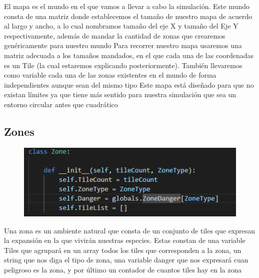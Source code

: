 \documentclass{llncs}
\begin{document}
El mapa es el mundo en el que vamos a llevar a cabo la simulación. Este mundo consta de una matriz donde establecemos el tamaño de nuestro mapa de acuerdo al largo y ancho, a lo cual nombramos tamaño del eje X y tamaño del Eje Y respectivamente, además de mandar la cantidad de zonas que crearemos genéricamente para nuestro mundo
\newline
\newline
Para recorrer nuestro mapa usaremos una matriz adecuada a los tamaños mandados, en el que cada una de las coordenadas es un Tile (la cual estaremos explicando posteriormente). También llevaremos como variable cada una de las zonas existentes en el mundo de forma independientes aunque sean del mismo tipo
\newline
\newline
Este mapa está diseñado para que no existan límites ya que tiene más sentido para nuestra simulación que sea un entorno circular antes que cuadrático

\subsection{Zones}
\begin{figure}
	\centering
	\includegraphics[width=0.7\linewidth]{imagenes/Zona}
	\label{fig:zona}
\end{figure}


Una zona es un ambiente natural que consta de un conjunto de tiles que expresan la expansión en la que vivirán nuestras especies.
\newline
\newline
Estas constan de una variable Tiles que agrupará en un array todos los tiles que corresponden a la zona, un string que nos diga el tipo de zona, una variable danger que nos expresará cuan peligroso es la zona, y por último un contador de cuantos tiles hay en la zona
\end{document}
